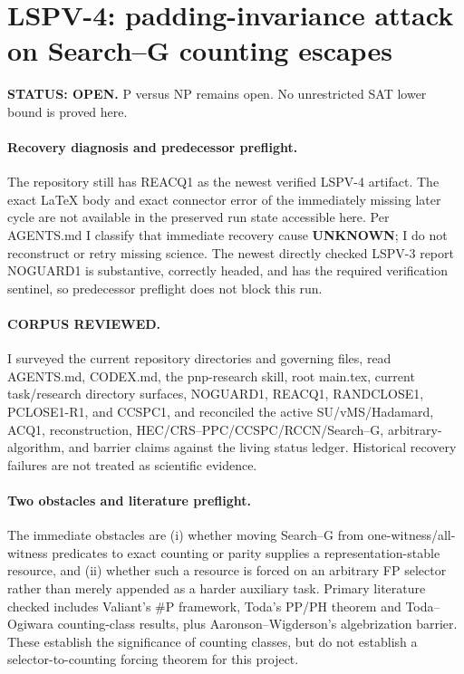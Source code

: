 \documentclass[11pt]{article}
\begin{document}
\section*{LSPV-4: padding-invariance attack on Search--G counting escapes}
\textbf{STATUS: OPEN.} P versus NP remains open. No unrestricted SAT lower bound is proved here.

\paragraph{Recovery diagnosis and predecessor preflight.}
The repository still has REACQ1 as the newest verified LSPV-4 artifact. The exact LaTeX body and exact connector error of the immediately missing later cycle are not available in the preserved run state accessible here. Per AGENTS.md I classify that immediate recovery cause \textbf{UNKNOWN}; I do not reconstruct or retry missing science. The newest directly checked LSPV-3 report NOGUARD1 is substantive, correctly headed, and has the required verification sentinel, so predecessor preflight does not block this run.

\paragraph{CORPUS REVIEWED.}
I surveyed the current repository directories and governing files, read AGENTS.md, CODEX.md, the pnp-research skill, root main.tex, current task/research directory surfaces, NOGUARD1, REACQ1, RANDCLOSE1, PCLOSE1-R1, and CCSPC1, and reconciled the active SU/vMS/Hadamard, ACQ1, reconstruction, HEC/CRS--PPC/CCSPC/RCCN/Search--G, arbitrary-algorithm, and barrier claims against the living status ledger. Historical recovery failures are not treated as scientific evidence.

\paragraph{Two obstacles and literature preflight.}
The immediate obstacles are (i) whether moving Search--G from one-witness/all-witness predicates to exact counting or parity supplies a representation-stable resource, and (ii) whether such a resource is forced on an arbitrary FP selector rather than merely appended as a harder auxiliary task. Primary literature checked includes Valiant's \#P framework, Toda's PP/PH theorem and Toda--Ogiwara counting-class results, plus Aaronson--Wigderson's algebrization barrier. These establish the significance of counting classes, but do not establish a selector-to-counting forcing theorem for this project.
\end{document}

